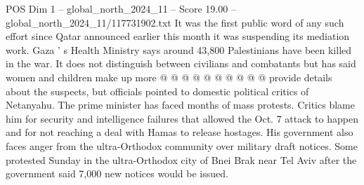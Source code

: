 \begin{textsample}{POS Dim 1 – global\_north\_2024\_11 – Score 19.00 – global\_north\_2024\_11/117731902.txt}
It was the first public word of any such effort since Qatar announced earlier this month it was suspending its mediation work.
Gaza ' s Health Ministry says around 43,800 Palestinians have been killed in the war.
It does not distinguish between civilians and combatants but has said women and children make up more @ @ @ @ @ @ @ @ @ @ provide details about the suspects, but officials pointed to domestic political critics of Netanyahu.
The prime minister has faced months of mass protests.
Critics blame him for security and intelligence failures that allowed the Oct. 7 attack to happen and for not reaching a deal with Hamas to release hostages.
His government also faces anger from the ultra-Orthodox community over military draft notices.
Some protested Sunday in the ultra-Orthodox city of Bnei Brak near Tel Aviv after the government said 7,000 new notices would be issued.

\end{textsample}
